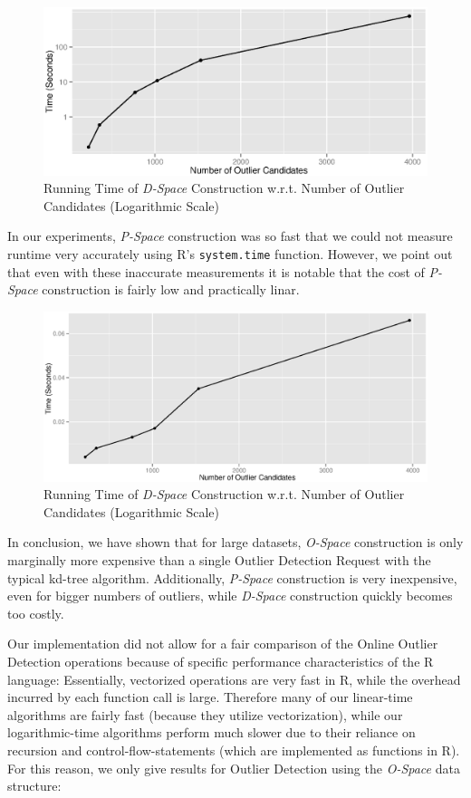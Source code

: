 \documentclass[runningheads]{llncs}
\begin{document}
\begin{figure}[H]
\includegraphics[width=\textwidth]{images/num_ocs_vs_dspace.eps}
\caption{Running Time of \emph{D-Space} Construction w.r.t. Number of Outlier Candidates (Logarithmic Scale)}
\end{figure}

In our experiments, \emph{P-Space} construction was so fast that we could not measure runtime very accurately using R's \texttt{system.time} function. However, we point out that even with these inaccurate measurements it is notable that the cost of \emph{P-Space} construction is fairly low and practically linar.

\begin{figure}[H]
\includegraphics[width=\textwidth]{images/pspace_vs_ocs.eps}
\caption{Running Time of \emph{D-Space} Construction w.r.t. Number of Outlier Candidates (Logarithmic Scale)}
\end{figure}

In conclusion, we have shown that for large datasets, \emph{O-Space} construction is only marginally more expensive than a single Outlier Detection Request with the typical kd-tree algorithm. Additionally, \emph{P-Space} construction is very inexpensive, even for bigger numbers of outliers, while \emph{D-Space} construction quickly becomes too costly. 

Our implementation did not allow for a fair comparison of the Online Outlier Detection operations because of specific performance characteristics of the R language: Essentially, vectorized operations are very fast in R, while the overhead incurred by each function call is large. Therefore many of our linear-time algorithms are fairly fast (because they utilize vectorization), while our logarithmic-time algorithms perform much slower due to their reliance on recursion and control-flow-statements (which are implemented as functions in R). For this reason, we only give results for Outlier Detection using the \emph{O-Space} data structure:
\end{document}
